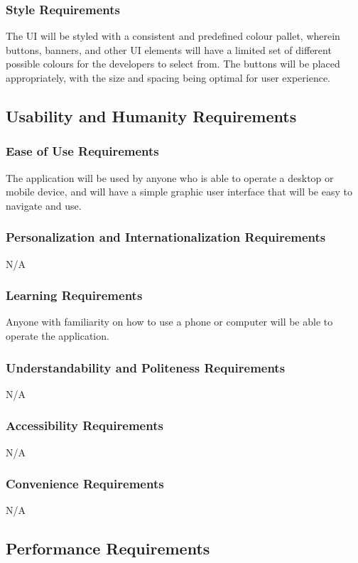 \documentclass[12pt]{article}
\begin{document}
\subsubsection{Style Requirements}
The UI will be styled with a consistent and predefined colour pallet, wherein buttons, banners, and other UI elements will have a limited set of different possible colours for the developers to select from. 
The buttons will be placed appropriately, with the size and spacing being optimal for user experience.

\subsection{Usability and Humanity Requirements}

\subsubsection{Ease of Use Requirements}
The application will be used by anyone who is able to operate a desktop or mobile device, and will have a simple graphic user interface that will be easy to navigate and use.

\subsubsection{Personalization and Internationalization Requirements}
N/A

\subsubsection{Learning Requirements}
Anyone with familiarity on how to use a phone or computer will be able to operate the application.

\subsubsection{Understandability and Politeness Requirements}
N/A

\subsubsection{Accessibility Requirements}
N/A

\subsubsection{Convenience Requirements}
N/A
\subsection{Performance Requirements}
\end{document}
